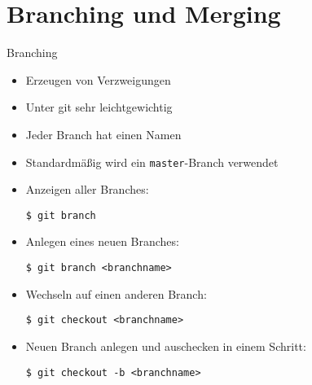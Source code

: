 \section{Branching und Merging}

\begin{frame}
  \tableofcontents[currentsection]
\end{frame}

\begin{frame}{Branching}
  \begin{itemize}
    \item Erzeugen von Verzweigungen
    \item Unter git sehr leichtgewichtig
    \item Jeder Branch hat einen Namen
    \item Standardmäßig wird ein \texttt{master}-Branch verwendet
    \framebreak

    \item Anzeigen aller Branches:
    \begin{lstlisting}
$ git branch
    \end{lstlisting}
    \item Anlegen eines neuen Branches:
    \begin{lstlisting}
$ git branch <branchname>
    \end{lstlisting}
    \item Wechseln auf einen anderen Branch:
    \begin{lstlisting}
$ git checkout <branchname>
    \end{lstlisting}
    \item Neuen Branch anlegen und auschecken in einem Schritt:
    \begin{lstlisting}
$ git checkout -b <branchname>
    \end{lstlisting}

  \end{itemize}

\end{frame}


